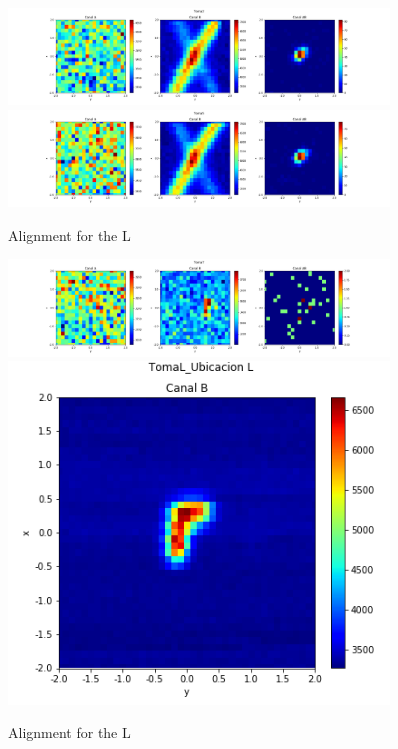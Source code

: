 \documentclass[xcolor=dvipsnames]{beamer}
\begin{document}
\begin{frame}
\begin{figure}
 \centering

{  \includegraphics[width=0.9\textwidth]{pictures/Toma2.png} }
{  \includegraphics[width=0.9\textwidth]{pictures/Toma5.png} }
\caption{Alignment for the L}
 \label{n1}
\end{figure}
\end{frame}

\begin{frame}
\begin{figure}
 \centering

{  \includegraphics[width=0.9\textwidth]{pictures/Toma7.png} }
{  \includegraphics[width=0.9\textwidth]{pictures/TomaL_UbicacionL.png} }
\caption{Alignment for the L}
 \label{n1}
\end{figure}
\end{frame}
\end{document}
